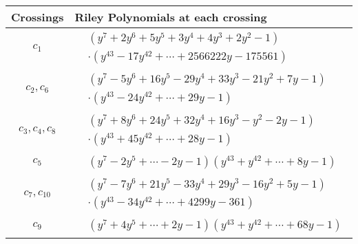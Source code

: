\documentclass[1p]{elsarticle_modified}
\theoremstyle{definition}
\begin{document}
\begin{tabular}{m{50pt}|m{274pt}}
Crossings & \hspace{64pt}Riley Polynomials at each crossing \\
\hline $$\begin{aligned}c_{1}\end{aligned}$$&$\begin{aligned}
&(y^7+2 y^6+5 y^5+3 y^4+4 y^3+2 y^2-1)\\
&\cdot(y^{43}-17 y^{42}+\cdots+2566222 y-175561)
\end{aligned}$\\
\hline $$\begin{aligned}c_{2},c_{6}\end{aligned}$$&$\begin{aligned}
&(y^7-5 y^6+16 y^5-29 y^4+33 y^3-21 y^2+7 y-1)\\
&\cdot(y^{43}-24 y^{42}+\cdots+29 y-1)
\end{aligned}$\\
\hline $$\begin{aligned}c_{3},c_{4},c_{8}\end{aligned}$$&$\begin{aligned}
&(y^7+8 y^6+24 y^5+32 y^4+16 y^3- y^2-2 y-1)\\
&\cdot(y^{43}+45 y^{42}+\cdots+28 y-1)
\end{aligned}$\\
\hline $$\begin{aligned}c_{5}\end{aligned}$$&$\begin{aligned}
&(y^7-2 y^5+\cdots-2 y-1)(y^{43}+y^{42}+\cdots+8 y-1)
\end{aligned}$\\
\hline $$\begin{aligned}c_{7},c_{10}\end{aligned}$$&$\begin{aligned}
&(y^7-7 y^6+21 y^5-33 y^4+29 y^3-16 y^2+5 y-1)\\
&\cdot(y^{43}-34 y^{42}+\cdots+4299 y-361)
\end{aligned}$\\
\hline $$\begin{aligned}c_{9}\end{aligned}$$&$\begin{aligned}
&(y^7+4 y^5+\cdots+2 y-1)(y^{43}+y^{42}+\cdots+68 y-1)
\end{aligned}$\\
\hline
\end{tabular}
\vskip 2pc
\end{document}
